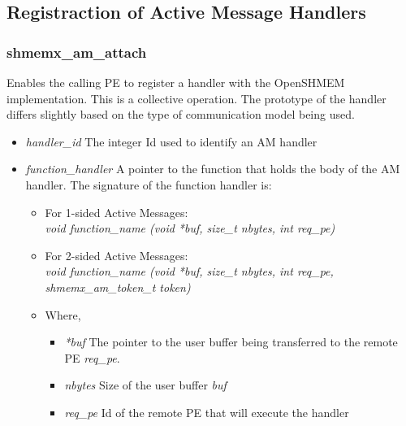 
\subsection{Registraction of Active Message Handlers}
\subsubsection{shmemx\_am\_attach}
Enables the calling PE to register a handler with 
the OpenSHMEM implementation. This is a collective 
operation. The prototype of the handler differs 
slightly based on the type of communication model 
being used.\\


\begin{itemize}
    \item \textit{handler\_id} The integer Id used 
        to identify an AM handler
    \item \textit{function\_handler} A pointer to 
        the function that holds the body of the 
        AM handler. The signature of 
        the function handler is:
        \begin{itemize}
            \item For 1-sided Active 
                Messages:\\\textit{void 
                function\_name (void *buf, size\_t 
            nbytes, int req\_pe)}
            \item For 2-sided Active 
                Messages:\\\textit{void 
                function\_name (void *buf, size\_t nbytes, int req\_pe, shmemx\_am\_token\_t token)}
            \item Where,
                \begin{itemize}
                    \item \textit{*buf} The 
                        pointer to the user buffer 
                        being transferred to the 
                        remote PE 
                        \textit{req\_pe}.
                    \item \textit{nbytes} Size of 
                        the user buffer 
                        \textit{buf}
                    \item \textit{req\_pe} Id of 
                        the remote PE that will 
                        execute the handler 
                \end{itemize}
       \end{itemize}
\end{itemize}

